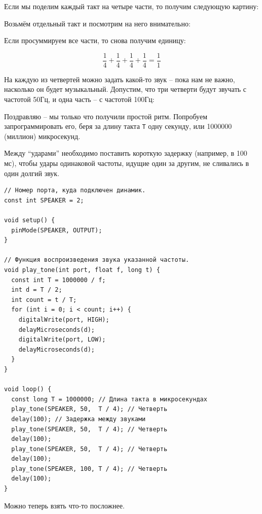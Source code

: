 \documentclass[../sparc.tex]{subfiles}
\begin{document}
Если мы поделим каждый такт на четыре части, то получим следующую картину:


Возьмём отдельный такт и посмотрим на него внимательно:


Если просуммируем все части, то снова получим единицу:

\begin{equation}
  \frac{1}{4} + \frac{1}{4} + \frac{1}{4} + \frac{1}{4} = \frac{1}{1}
\end{equation}

На каждую из четвертей можно задать какой-то звук -- пока нам не важно, насколько
он будет музыкальный. Допустим, что три четверти будут звучать с частотой 50Гц,
и одна часть -- с частотой 100Гц:


Поздравляю -- мы только что получили простой ритм. Попробуем запрограммировать
его, беря за длину такта \texttt{T} одну секунду, или 1000000 (миллион)
микросекунд.

Между ``ударами'' необходимо поставить короткую задержку (например, в 100 мс),
чтобы удары одинаковой частоты, идущие один за другим, не сливались в один
долгий звук.

\begin{verbatim}
// Номер порта, куда подключен динамик.
const int SPEAKER = 2;

void setup() {
  pinMode(SPEAKER, OUTPUT);
}

// Функция воспроизведения звука указанной частоты.
void play_tone(int port, float f, long t) {
  const int T = 1000000 / f;
  int d = T / 2;
  int count = t / T;
  for (int i = 0; i < count; i++) {
    digitalWrite(port, HIGH);
    delayMicroseconds(d);
    digitalWrite(port, LOW);
    delayMicroseconds(d);
  }
}

void loop() {
  const long T = 1000000; // Длина такта в микросекундах
  play_tone(SPEAKER, 50,  T / 4); // Четверть
  delay(100); // Задержка между звуками
  play_tone(SPEAKER, 50,  T / 4); // Четверть
  delay(100);
  play_tone(SPEAKER, 50,  T / 4); // Четверть
  delay(100);
  play_tone(SPEAKER, 100, T / 4); // Четверть
  delay(100);
}
\end{verbatim}

Можно теперь взять что-то посложнее.

\end{document}
